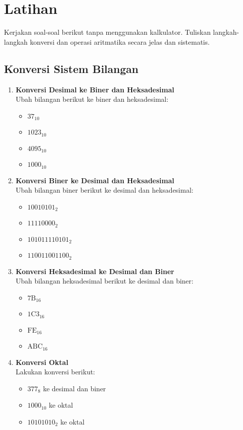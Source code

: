 \section{Latihan}

Kerjakan soal-soal berikut tanpa menggunakan kalkulator. Tuliskan langkah-langkah konversi dan operasi aritmatika secara jelas dan sistematis.

\subsection{Konversi Sistem Bilangan}

\begin{enumerate}
    \item \textbf{Konversi Desimal ke Biner dan Heksadesimal}\\
    Ubah bilangan berikut ke biner dan heksadesimal:
    \begin{itemize}
        \item \(37_{10}\)
        \item \(1023_{10}\)
        \item \(4095_{10}\)
        \item \(1000_{10}\)
    \end{itemize}

    \item \textbf{Konversi Biner ke Desimal dan Heksadesimal}\\
    Ubah bilangan biner berikut ke desimal dan heksadesimal:
    \begin{itemize}
        \item \(10010101_2\)
        \item \(11110000_2\)
        \item \(101011110101_2\)
        \item \(110011001100_2\)
    \end{itemize}

    \item \textbf{Konversi Heksadesimal ke Desimal dan Biner}\\
    Ubah bilangan heksadesimal berikut ke desimal dan biner:
    \begin{itemize}
        \item \(\mathrm{7B}_{16}\)
        \item \(\mathrm{1C3}_{16}\)
        \item \(\mathrm{FE}_{16}\)
        \item \(\mathrm{ABC}_{16}\)
    \end{itemize}

    \item \textbf{Konversi Oktal}\\
    Lakukan konversi berikut:
    \begin{itemize}
        \item \(377_8\) ke desimal dan biner
        \item \(1000_{10}\) ke oktal
        \item \(10101010_2\) ke oktal
    \end{itemize}
\end{enumerate}

